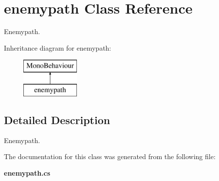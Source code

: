 \section{enemypath Class Reference}
\label{classenemypath}


Enemypath.  


Inheritance diagram for enemypath\+:\begin{figure}[H]
\begin{center}
\leavevmode
\includegraphics[height=2.000000cm]{classenemypath}
\end{center}
\end{figure}


\subsection{Detailed Description}
Enemypath. 



The documentation for this class was generated from the following file\+:\begin{DoxyCompactItemize}
\item 
{\bf enemypath.\+cs}\end{DoxyCompactItemize}
